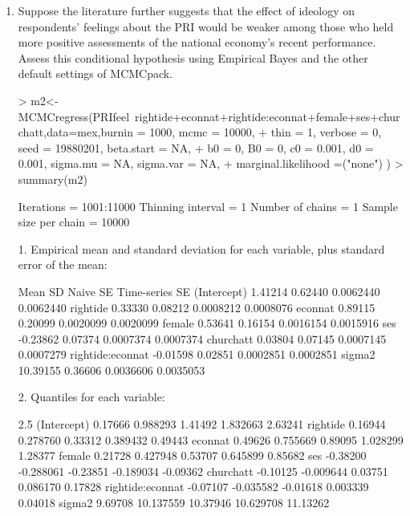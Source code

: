 \documentclass[12pt]{article}
\begin{document}
\begin{enumerate}
\item Suppose the literature further suggests that the effect of ideology on respondents' feelings about the PRI would be weaker among those who held more positive assessments of the national economy's recent performance.  Assess this conditional hypothesis using Empirical Bayes and the other default settings of MCMCpack.  \\

\begin{Schunk}
\begin{Sinput}
> m2<-MCMCregress(PRIfeel~rightide+econnat+rightide:econnat+female+ses+churchatt,data=mex,burnin = 1000, mcmc = 10000,
+     thin = 1, verbose = 0, seed = 19880201, beta.start = NA, 
+     b0 = 0, B0 = 0, c0 = 0.001, d0 = 0.001, sigma.mu = NA, sigma.var = NA, 
+     marginal.likelihood =("none") )
> summary(m2)
\end{Sinput}
\begin{Soutput}
Iterations = 1001:11000
Thinning interval = 1 
Number of chains = 1 
Sample size per chain = 10000 

1. Empirical mean and standard deviation for each variable,
   plus standard error of the mean:

                     Mean      SD  Naive SE Time-series SE
(Intercept)       1.41214 0.62440 0.0062440      0.0062440
rightide          0.33330 0.08212 0.0008212      0.0008076
econnat           0.89115 0.20099 0.0020099      0.0020099
female            0.53641 0.16154 0.0016154      0.0015916
ses              -0.23862 0.07374 0.0007374      0.0007374
churchatt         0.03804 0.07145 0.0007145      0.0007279
rightide:econnat -0.01598 0.02851 0.0002851      0.0002851
sigma2           10.39155 0.36606 0.0036606      0.0035053

2. Quantiles for each variable:

                     2.5%
(Intercept)       0.17666  0.988293  1.41492  1.832663  2.63241
rightide          0.16944  0.278760  0.33312  0.389432  0.49443
econnat           0.49626  0.755669  0.89095  1.028299  1.28377
female            0.21728  0.427948  0.53707  0.645899  0.85682
ses              -0.38200 -0.288061 -0.23851 -0.189034 -0.09362
churchatt        -0.10125 -0.009644  0.03751  0.086170  0.17828
rightide:econnat -0.07107 -0.035582 -0.01618  0.003339  0.04018
sigma2            9.69708 10.137559 10.37946 10.629708 11.13262
\end{Soutput}
\end{Schunk}


\end{enumerate}
\end{document}
